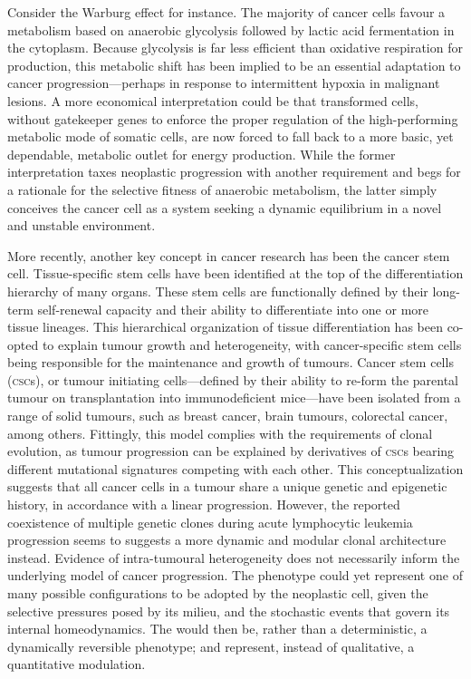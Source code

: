 Consider the Warburg effect\cite{warburg_origin_1956} for instance.  The
majority of cancer cells favour a metabolism based on anaerobic glycolysis
followed by lactic acid fermentation in the cytoplasm.  Because glycolysis is
far less efficient than oxidative respiration for  production,
this metabolic shift has been implied to be an essential adaptation to cancer
progression---perhaps in response to intermittent hypoxia in malignant
lesions.\cite{gatenby_why_2004} A more economical interpretation could be that
transformed cells, without gatekeeper genes to enforce the proper regulation of
the high-performing metabolic mode of somatic cells, are now forced to fall back
to a more basic, yet dependable, metabolic outlet for energy production.  While
the former interpretation taxes neoplastic progression with another requirement
and begs for a rationale for the selective fitness of anaerobic metabolism, the
latter simply conceives the cancer cell as a system seeking a dynamic
equilibrium in a novel and unstable environment.

More recently, another key concept in cancer research has been the cancer stem
cell.  Tissue-specific stem cells have been identified at the top of the
differentiation hierarchy of many organs.  These stem cells are functionally
defined by their long-term self-renewal capacity and their ability to
differentiate into one or more tissue lineages.  This hierarchical organization
of tissue differentiation has been co-opted to explain tumour growth and
heterogeneity, with cancer-specific stem cells being responsible for the
maintenance and growth of tumours.  Cancer stem cells (\textsc{csc}s), or tumour
initiating cells---defined by their ability to re-form the parental tumour on
transplantation into immunodeficient mice---have been isolated from a range of
solid tumours, such as breast cancer, brain tumours, colorectal cancer, among
others.\cite{beck_unravelling_2013} Fittingly, this model complies with the
requirements of clonal evolution, as tumour progression can be explained by
derivatives of \textsc{csc}s bearing different mutational signatures competing
with each other.  This conceptualization suggests that all cancer cells in a
tumour share a unique genetic and epigenetic history, in accordance with a
linear progression.  However, the reported coexistence of multiple genetic
clones during acute lymphocytic leukemia progression seems to suggests a more
dynamic and modular clonal architecture
instead.\cite{anderson_genetic_2011,notta_evolution_2011} Evidence of
intra-tumoural heterogeneity does not necessarily inform the underlying model of
cancer progression.  The  phenotype could yet represent one of
many possible configurations to be adopted by the neoplastic cell, given the
selective pressures posed by its milieu, and the stochastic events that govern
its internal homeodynamics.  The  would then be, rather than a
deterministic, a dynamically reversible phenotype; and represent, instead of
qualitative, a quantitative
modulation.\cite{maenhaut_cancer_2010,tarabichi_systems_2013}

